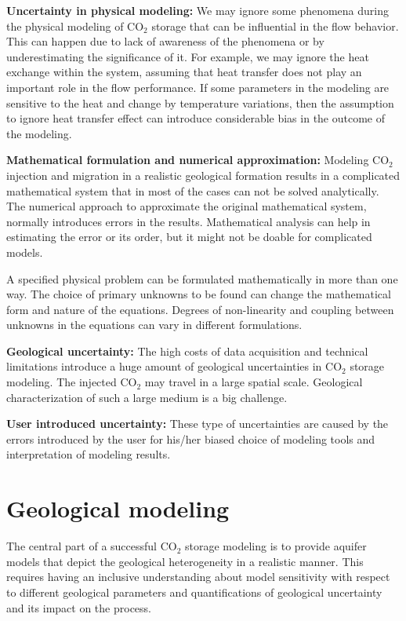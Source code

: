 \textbf{Uncertainty in physical modeling:} We may ignore some phenomena during
the physical modeling of $\mbox{CO}_2$ storage that can be influential in the
flow behavior. This can happen due to lack of awareness of the phenomena or by
underestimating the significance of it. For
example, we may ignore the heat exchange within the system, assuming that heat transfer does not play an important role in the flow performance. If some parameters in the modeling are sensitive to the heat and change by temperature variations, then the assumption to ignore heat transfer effect can introduce considerable bias in the outcome of the modeling.

\textbf{Mathematical formulation and numerical approximation:} Modeling $\mbox{CO}_2$ injection and migration in a realistic geological
formation results in a complicated mathematical system that in most of the cases
can not be solved analytically. The numerical approach to approximate the
original mathematical system, normally introduces errors in the results.
Mathematical analysis can help in estimating the error or its order, but it
might not be doable for complicated models.

A specified
physical problem can be formulated mathematically in more than one way. The
choice of primary unknowns to be found can change the mathematical form and
nature of the equations. Degrees of non-linearity and coupling between unknowns
in the equations can vary in different formulations. 



\textbf{Geological uncertainty:} The high costs of data acquisition and
technical
limitations introduce a huge amount of geological uncertainties in $\mbox{CO}_2$
storage modeling. The injected $\mbox{CO}_2$ may travel in a large spatial scale. Geological characterization of such a large medium is a big challenge.

\textbf{User introduced uncertainty:} These type of uncertainties are caused by
the errors introduced by the user for his/her biased choice of modeling tools and
interpretation of modeling results. 

\section{Geological modeling}
\label{sec:GeologicalModeling}

The central part of a successful $\mbox{CO}_2$ storage modeling is to
provide aquifer models that depict the geological heterogeneity in a
realistic manner. This requires having an inclusive understanding about model
sensitivity with respect to different geological parameters and quantifications
of geological uncertainty and its impact on the process. 

